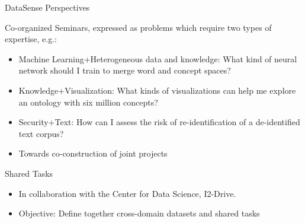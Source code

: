 
\begin{frame}{DataSense Perspectives}

Co-organized Seminars,
expressed as problems which require two types of expertise, e.g.:

\begin{itemize}
\item Machine Learning+Heterogeneous data and knowledge:
  What kind of neural network should I train to merge word and concept spaces?
\item Knowledge+Visualization: What kinds of visualizations can help me explore an ontology with six million concepts?
\item Security+Text: How can I assess the risk of re-identification of a de-identified text corpus?

\item  Towards co-construction of joint projects
\end{itemize}

Shared Tasks

\begin{itemize}
\item In collaboration with the Center for Data Science, I2-Drive.
\item Objective: Define together cross-domain datasets and shared tasks
\end{itemize}
\end{frame}

